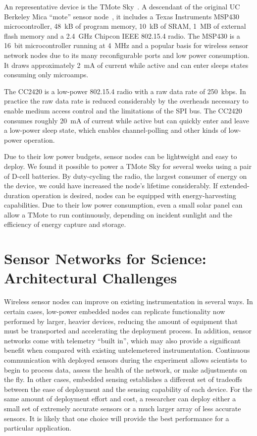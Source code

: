 An representative device is the TMote Sky~\cite{moteiv}. A descendant of the
original UC Berkeley Mica ``mote'' sensor node~\cite{hill-thesis}, it
includes a Texas Instruments MSP430 microcontroller, 48~kB of program memory,
10~kB of SRAM, 1~MB of external flash memory and a 2.4~GHz Chipcon IEEE
802.15.4 radio. The MSP430 is a 16~bit microcontroller running at 4~MHz and a
popular basis for wireless sensor network nodes due to its many
reconfigurable ports and low power consumption. It draws approximately 2~mA
of current while active and can enter sleeps states consuming only microamps.

The CC2420 is a low-power 802.15.4 radio with a raw data rate of 250~kbps. In
practice the raw data rate is reduced considerably by the overheads necessary
to enable medium access control and the limitations of the SPI bus. The
CC2420 consumes roughly 20~mA of current while active but can quickly enter
and leave a low-power sleep state, which enables channel-polling and other
kinds of low-power operation.

Due to their low power budgets, sensor nodes can be lightweight and easy to
deploy. We found it possible to power a TMote Sky for several weeks using a
pair of D-cell batteries. By duty-cycling the radio, the largest consumer of
energy on the device, we could have increased the node's lifetime
considerably. If extended-duration operation is desired, nodes can be
equipped with energy-harvesting capabilities. Due to their low power
consumption, even a small solar panel can allow a TMote to run continuously,
depending on incident sunlight and the efficiency of energy capture and
storage.

\section{Sensor Networks for Science: Architectural Challenges}

Wireless sensor nodes can improve on existing instrumentation in several
ways. In certain cases, low-power embedded nodes can replicate functionality
now performed by larger, heavier devices, reducing the amount of equipment
that must be transported and accelerating the deployment process. In
addition, sensor networks come with telemetry ``built in'', which may also
provide a significant benefit when compared with existing untelemetered
instrumentation. Continuous communication with deployed sensors during the
experiment allows scientists to begin to process data, assess the health of
the network, or make adjustments on the fly. In other cases, embedded sensing
establishes a different set of tradeoffs between the ease of deployment and
the sensing capability of each device. For the same amount of deployment
effort and cost, a researcher can deploy either a small set of extremely
accurate sensors or a much larger array of less accurate sensors. It is
likely that one choice will provide the best performance for a particular
application.

